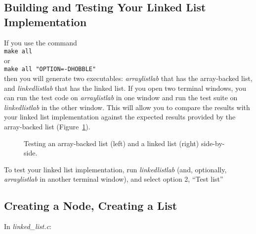 \subsection{Building and Testing Your Linked List Implementation}

If you use the command \\
\verb+make all+ \\
or \\
\verb+make all "OPTION=-DHOBBLE"+ \\
then you will generate two executables: \textit{arraylistlab} that has the array-backed list, and \textit{linkedlistlab} that has the linked list.
If you open two terminal windows, you can run the test code on \textit{arraylistlab} in one window and run the test suite on \textit{linkedlistlab} in the other window.
This will allow you to compare the results with your linked list implementation against the expected results provided by the array-backed list (Figure~\ref{fig:SideBySideTesting}).

\begin{figure}
    \centering
    \caption{Testing an array-backed list (left) and a linked list (right) side-by-side.}
    \label{fig:SideBySideTesting}
\end{figure}

To test your linked list implementation, run \textit{linkedlistlab} (and, optionally, \textit{arraylistlab} in another terminal window),
and select option 2, ``Test list''


\subsection{Creating a Node, Creating a List}

In \textit{linked\_list.c}:

\begin{description}
\end{description}

